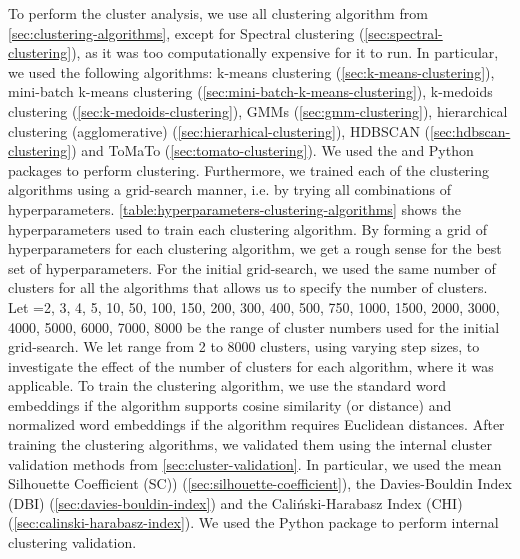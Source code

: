 To perform the cluster analysis, we use all clustering algorithm from \cref{sec:clustering-algorithms}, except for Spectral clustering (\cref{sec:spectral-clustering}), as it was too computationally expensive for it to run. In particular, we used the following algorithms: k-means clustering (\cref{sec:k-means-clustering}), mini-batch k-means clustering (\cref{sec:mini-batch-k-means-clustering}), k-medoids clustering (\cref{sec:k-medoids-clustering}), GMMs (\cref{sec:gmm-clustering}), hierarchical clustering (agglomerative) (\cref{sec:hierarhical-clustering}), HDBSCAN (\cref{sec:hdbscan-clustering}) and ToMaTo (\cref{sec:tomato-clustering}). We used the  \cite{ScikitLearn2011} and  \cite{mcinnes2017hdbscan} Python packages to perform clustering. Furthermore, we trained each of the clustering algorithms using a grid-search manner, i.e. by trying all combinations of hyperparameters. \cref{table:hyperparameters-clustering-algorithms} shows the hyperparameters used to train each clustering algorithm. By forming a grid of hyperparameters for each clustering algorithm, we get a rough sense for the best set of hyperparameters. For the initial grid-search, we used the same number of clusters for all the algorithms that allows us to specify the number of clusters. Let =2, 3, 4, 5, 10, 50, 100, 150, 200, 300, 400, 500, 750, 1000, 1500, 2000, 3000, 4000, 5000, 6000, 7000, 8000 be the range of cluster numbers used for the initial grid-search. We let  range from 2 to 8000 clusters, using varying step sizes, to investigate the effect of the number of clusters for each algorithm, where it was applicable. To train the clustering algorithm, we use the standard word embeddings if the algorithm supports cosine similarity (or distance) and normalized word embeddings if the algorithm requires Euclidean distances. After training the clustering algorithms, we validated them using the internal cluster validation methods from \cref{sec:cluster-validation}. In particular, we used the mean Silhouette Coefficient (SC)) (\cref{sec:silhouette-coefficient}), the Davies-Bouldin Index (DBI) (\cref{sec:davies-bouldin-index}) and the Caliński-Harabasz Index (CHI) (\cref{sec:calinski-harabasz-index}). We used the  Python package to perform internal clustering validation.
